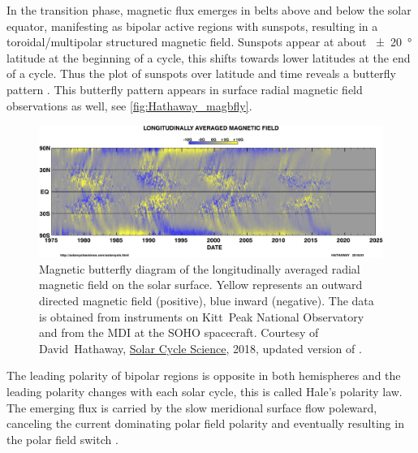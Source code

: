 In the transition phase, magnetic flux emerges in belts above and below the solar equator, manifesting as bipolar active regions with sunspots, resulting in a toroidal/multipolar structured magnetic field. Sunspots appear at about \SI{+-20}{\degree} latitude at the beginning of a cycle, this shifts towards lower latitudes at the end of a cycle. Thus the plot of sunspots over latitude and time reveals a butterfly pattern \citep{Maunder1904}. This butterfly pattern appears in surface radial magnetic field observations as well, see \autoref{fig:Hathaway_magbfly}.
\begin{figure}[htb]
	\centering
	\includegraphics[width=\textwidth]{figures_of_others/images/Hathaway_magbfly_201801_cropped.png}
	\caption[Courtesy of David~Hathaway, \href{http://solarcyclescience.com/solarcycle.html}{Solar Cycle Science}, 2018, updated version of {\citet[][Fig.~17]{Hathaway2015}}.]
	{Magnetic butterfly diagram of the longitudinally averaged radial magnetic field on the solar surface. Yellow represents an outward directed magnetic field (positive), blue inward (negative). The data is obtained from instruments on Kitt~Peak National Observatory and from the MDI at the SOHO spacecraft. Courtesy of David~Hathaway, \href{http://solarcyclescience.com/solarcycle.html}{Solar Cycle Science}, 2018, updated version of \citet[][Fig.~17]{Hathaway2015}.}
	\label{fig:Hathaway_magbfly}
\end{figure}
The leading polarity of bipolar regions is opposite in both hemispheres and the leading polarity changes with each solar cycle, this is called Hale's polarity law. The emerging flux is carried by the slow meridional surface flow poleward, canceling the current dominating polar field polarity and eventually resulting in the polar field switch \citep{Hathaway2015}.

